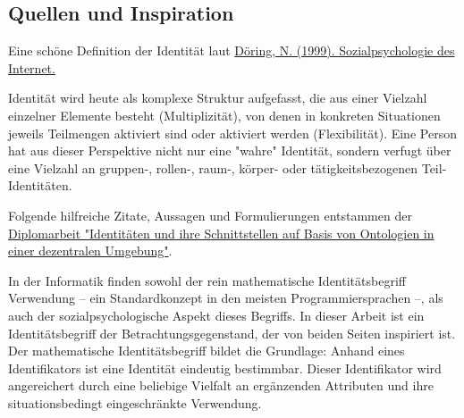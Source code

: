 
\subsection{Quellen und Inspiration}
\label{sec:inspiration}

\vspace{0.3cm}

Eine schöne Definition der Identität laut \href{https://link.springer.com/article/10.1007/s11612-001-0022-y}{Döring, N. (1999). Sozialpsychologie des Internet.}

\vspace{0.3cm}

\begin{Business-Def}

Identität wird heute als komplexe Struktur aufgefasst, die aus einer Vielzahl einzelner Elemente besteht (Multiplizität), von denen in konkreten Situationen jeweils Teilmengen aktiviert sind oder aktiviert werden (Flexibilität). Eine Person hat aus dieser Perspektive nicht nur eine "wahre" Identität, sondern verfugt über eine Vielzahl an gruppen-, rollen-, raum-, körper- oder tätigkeitsbezogenen Teil-Identitäten.

\end{Business-Def}

\vspace{0.3cm}

Folgende hilfreiche Zitate, Aussagen und Formulierungen entstammen der \href{https://vsis-www.informatik.uni-hamburg.de/getDoc.php/thesis/47/DA_Gordian_Kaulbarsch.pdf}{Diplomarbeit "Identitäten und ihre Schnittstellen auf Basis von Ontologien in einer dezentralen Umgebung"}. 

\vspace{0.3cm}

\begin{Zitat}

In der Informatik finden sowohl der rein mathematische Identitätsbegriff Verwendung
– ein Standardkonzept in den meisten Programmiersprachen –, als auch der sozialpsychologische Aspekt dieses Begriffs. In dieser Arbeit ist ein Identitätsbegriff der Betrachtungsgegenstand, der von beiden Seiten inspiriert ist. Der mathematische Identitätsbegriff bildet die Grundlage: Anhand eines Identifikators ist eine Identität eindeutig
bestimmbar. Dieser Identifikator wird angereichert durch eine beliebige Vielfalt an ergänzenden Attributen und ihre situationsbedingt eingeschränkte Verwendung.

\end{Zitat}

